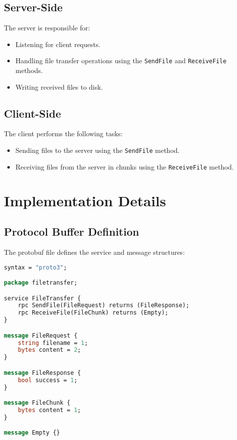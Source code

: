 \documentclass{article}
\begin{document}
\subsection{Server-Side}
The server is responsible for:
\begin{itemize}
    \item Listening for client requests.
    \item Handling file transfer operations using the \texttt{SendFile} and \texttt{ReceiveFile} methods.
    \item Writing received files to disk.
\end{itemize}

\subsection{Client-Side}
The client performs the following tasks:
\begin{itemize}
    \item Sending files to the server using the \texttt{SendFile} method.
    \item Receiving files from the server in chunks using the \texttt{ReceiveFile} method.
\end{itemize}

\section{Implementation Details}

\subsection{Protocol Buffer Definition}
The protobuf file defines the service and message structures:
\begin{lstlisting}[language=protobuf, caption=Protocol Buffer Definition]
syntax = "proto3";

package filetransfer;

service FileTransfer {
    rpc SendFile(FileRequest) returns (FileResponse);
    rpc ReceiveFile(FileChunk) returns (Empty);
}

message FileRequest {
    string filename = 1;
    bytes content = 2;
}

message FileResponse {
    bool success = 1;
}

message FileChunk {
    bytes content = 1;
}

message Empty {}
\end{lstlisting}
\end{document}
